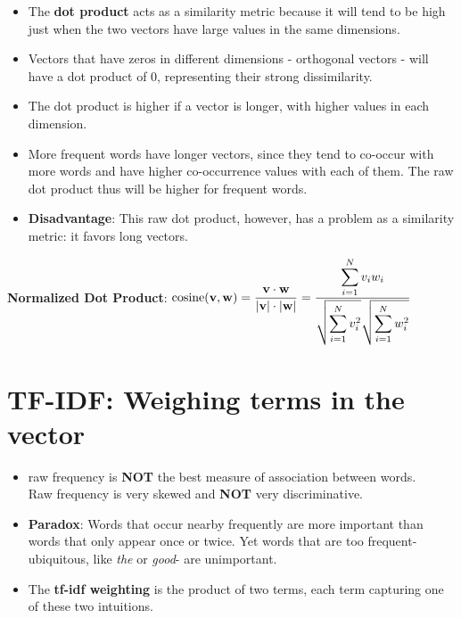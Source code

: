 \begin{itemize}
    \item The \textbf{dot product} acts as a similarity metric because it will tend to be high just when the two vectors have large values in the same dimensions. 
    
    \item Vectors that have zeros in different dimensions - orthogonal vectors - will have a dot product of 0, representing their strong dissimilarity.

    \item The dot product is higher if a vector is longer, with higher values in each dimension.
    
    \item More frequent words have longer vectors, since they tend to co-occur with more words and have higher co-occurrence values with each of them. The raw dot product thus will be higher for frequent words.

    \item \textbf{Disadvantage}: This raw dot product, however, has a problem as a similarity metric: it favors long vectors.

    
\end{itemize}


\textbf{Normalized Dot Product}: \( \displaystyle \operatorname{cosine}(\mathbf{v,w}) = \dfrac{\mathbf{v\cdot w}}{|\mathbf{v}|\cdot|\mathbf{w}|} = \dfrac{\displaystyle\sum_{i=1}^{N} v_i w_i}{\displaystyle \sqrt{\sum_{i=1}^{N} v_i^2}\sqrt{\sum_{i=1}^{N} w_i^2}} \)


\section{TF-IDF: Weighing terms in the vector \cite{nlp-1}}\label{TF-IDF: concept}

\begin{itemize}
    \item raw frequency is \textbf{NOT} the best measure of association between words.\\
    Raw frequency is very skewed and \textbf{NOT} very discriminative.

    \item \textbf{Paradox}: Words that occur nearby frequently are more important than words that only appear once or twice. Yet words that are too frequent-ubiquitous, like \textit{the} or \textit{good}- are unimportant.

    \item The \textbf{tf-idf weighting} is the product of two terms, each term capturing one of these two intuitions.
\end{itemize}


